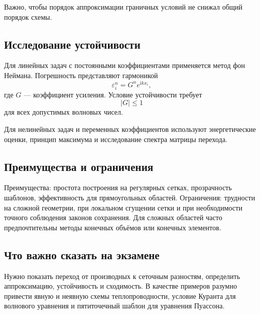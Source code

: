Важно, чтобы порядок аппроксимации граничных условий не снижал общий порядок
схемы.

\subsection{Исследование устойчивости}

Для линейных задач с постоянными коэффициентами применяется метод фон Неймана.
Погрешность представляют гармоникой
\[
    \varepsilon_i^n=G^n e^{\mathrm{i}k x_i},
\]
где $G$ --- коэффициент усиления. Условие устойчивости требует
\[
    |G|\leq1
\]
для всех допустимых волновых чисел.

Для нелинейных задач и переменных коэффициентов используют энергетические оценки,
принцип максимума и исследование спектра матрицы перехода.

\subsection{Преимущества и ограничения}

Преимущества: простота построения на регулярных сетках, прозрачность шаблонов,
эффективность для прямоугольных областей. Ограничения: трудности на сложной
геометрии, при локальном сгущении сетки и при необходимости точного соблюдения
законов сохранения. Для сложных областей часто предпочтительны методы конечных
объёмов или конечных элементов.

\subsection{Что важно сказать на экзамене}

Нужно показать переход от производных к сеточным разностям, определить
аппроксимацию, устойчивость и сходимость. В качестве примеров разумно привести
явную и неявную схемы теплопроводности, условие Куранта для волнового уравнения и
пятиточечный шаблон для уравнения Пуассона.

\newpage